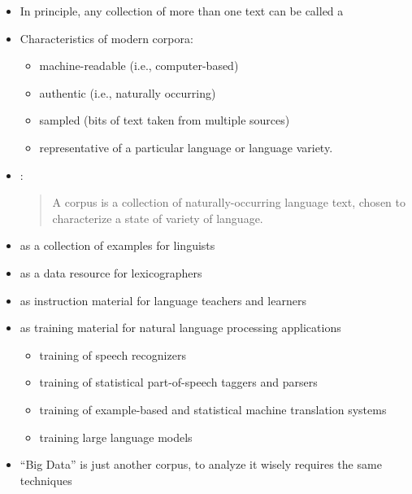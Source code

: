 \documentclass[a4paper,landscape,headrule,footrule,xetex]{foils}
\begin{document}
\begin{itemize}
\item  In principle, any collection of more than one text can be called a
\item  Characteristics of modern corpora:
  \begin{itemize}
  \item machine-readable (i.e., computer-based)
  \item authentic (i.e., naturally occurring)
  \item sampled (bits of text taken from multiple sources)
  \item representative of a particular language or language variety.
  \end{itemize}
\item  \citet[171]{Sinclair:1991}:
  \begin{quote}
    A corpus is a collection of naturally-occurring language text, chosen to characterize a state of variety of language.
\end{quote}
\end{itemize}


\begin{itemize}
\item as a collection of examples for linguists
\item as a data resource for lexicographers
\item as instruction material for language teachers and learners
\item as training material for natural language processing applications
  \begin{itemize}
  \item training of speech recognizers
  \item training of statistical part-of-speech taggers and parsers
  \item training of example-based and statistical machine translation systems
  \item training large language models
  \end{itemize}
\item ``Big Data'' is just another corpus, to analyze it wisely
  requires the same techniques

\end{itemize}
\end{document}
